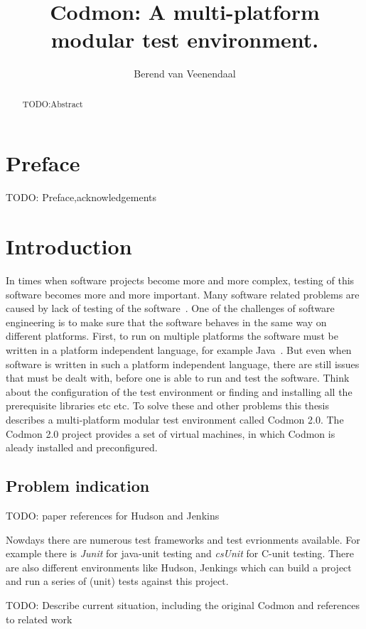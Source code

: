 \documentclass[a4paper,10pt]{scrartcl}
\title{Codmon: A multi-platform modular test environment.}
\author{Berend van Veenendaal}
\newcommand{\project}{Codmon 2.0}
\newcommand{\CS}{C\nolinebreak\hspace{-.05em}\raisebox{.6ex}{\bf \#}}
\begin{document}
\maketitle

\begin{abstract}
TODO:Abstract
\end{abstract}
\newpage
\section*{Preface}
\label{sec:Preface}
TODO: Preface,acknowledgements
\newpage
\tableofcontents
\newpage

\section{Introduction}
\label{sec:Introduction}
In times when software projects become more and more complex, testing of this software becomes more and more important. Many software
related problems are caused by lack of testing of the software~\cite{TTCST}. One of the challenges of software engineering is to make
sure that the software behaves in the same way on different platforms. First, to run on multiple platforms the software must be written in a
platform independent language, for example Java~\cite{Java}. But even when software is written in such a platform independent language, there 
are still issues that must be dealt with, before one is able to run and test the software. Think about the configuration of the test environment 
or finding and installing all the prerequisite libraries etc etc. To solve these and other problems this thesis describes a multi-platform modular
test environment called \project{}. The \project{} project provides a set of virtual machines, in which Codmon is aleady installed and
preconfigured.

\subsection{Problem indication}
\label{subsec:Problemindication}
TODO: paper references for Hudson and Jenkins

Nowdays there are numerous test frameworks and test evrionments available. For example there is \textit{Junit} for java-unit testing and \textit{csUnit} for \CS{}-unit testing.
There are also different environments like Hudson, Jenkings which can build a project and run a series of (unit) tests against this project. 

TODO: Describe current situation, including the original Codmon and references to related work
\end{document}
